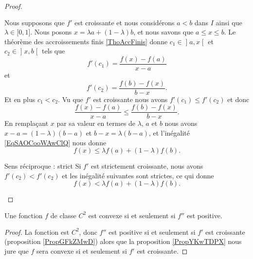 \begin{proof}
\begin{subproof}
             Nous supposons que \( f'\) est croissante et nous considérons \( a<b\) dans \( I\) ainsi que \( \lambda\in \mathopen[ 0 , 1 \mathclose]\). Nous posons \( x=\lambda a+(1-\lambda)b\), et nous savons que \( a\leq x\leq b\). Le théorème des accroissements finis \ref{ThoAccFinis} donne \( c_1\in\mathopen] a , x \mathclose[\) et \( c_2\in \mathopen] x , b \mathclose[\) tels que
                 \begin{equation}
                     f'(c_1)=\frac{ f(x)-f(a) }{ x-a }
                 \end{equation}
                 et 
                 \begin{equation}
                     f'(c_2)=\frac{ f(b)-f(x) }{ b-x }.
                 \end{equation}
                 Et en plus \( c_1<c_2\). Vu que \( f'\) est croissante nous avons \( f'(c_1)\leq f'(c_2)\) et donc
                 \begin{equation}       \label{EqSAOCooWAwClQ}
                     \frac{ f(x)-f(a) }{ x-a }\leq\frac{ f(b)-f(x) }{ b-x }.
                 \end{equation}
                 En remplaçant \( x\) par sa valeur en termes de \( \lambda\), \( a\) et \( b\) nous avons \( x-a=(1-\lambda)(b-a)\) et \( b-x=\lambda(b-a)\), et l'inégalité \eqref{EqSAOCooWAwClQ} nous donne
                 \begin{equation}
                     f(x)\leq \lambda f(a)+(1-\lambda)f(b).
                 \end{equation}
             \item[Sens réciproque : strict]
                 Si \( f'\) est strictement croissante, nous avons \( f'(c_2)<f'(c_2)\) et les inégalité suivantes sont strictes, ce qui donne
                 \begin{equation}
                     f(x)< \lambda f(a)+(1-\lambda)f(b).
                 \end{equation}
    \end{subproof}
\end{proof}

\begin{theorem} \label{ThoGXjKeYb}
    Une fonction \( f\) de classe \( C^2\) est convexe si et seulement si \( f''\) est positive.
\end{theorem}

\begin{proof}
    La fonction est \( C^2\), donc \( f''\) est positive si et seulement si \( f'\) est croissante (proposition \ref{PropGFkZMwD}) alors que la proposition \ref{PropYKwTDPX} nous jure que \( f\) sera convexe si et seulement si \( f'\) est croissante.
\end{proof}

